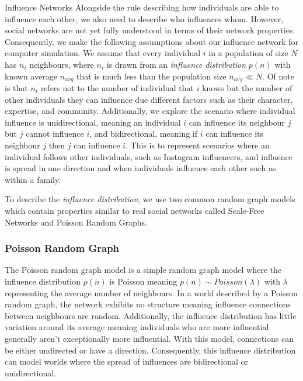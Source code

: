 \documentclass[10pt, oneside, reqno]{amsart}
\makeatletter
\theoremstyle{plain}%
\theoremstyle{definition}
\theoremstyle{remark}
\renewcommand\subsection{\@startsection{subsection}{2}%
  \z@{.5\linespacing\@plus.7\linespacing}{-.5em}%
  {\normalfont\scshape}}
\makeatother
\begin{document}
\subsection{Influence Networks}
Alongside the rule describing how individuals are able to influence each other, we also need to 
describe who influences whom.
However, social networks are not yet fully understood in terms of their network properties. 
Consequently, we make the following assumptions about our influence network for computer 
simulation.
We assume that every individual $i$ in a population of size $N$ has $n_i$ neighbours, where 
$n_i$ is drawn from an \textit{influence distribution} $p(n)$ with known average $n_{avg}$ that is much less 
than the population size $n_{avg} \ll N$.
Of note is that $n_i$ refers not to the number of individual that $i$ knows but the number of 
other individuals they can influence due different factors such as their character, expertise, 
and community.
Additionally, we explore the scenario where individual influence is unidirectional, meaning 
an individual $i$ can influence its neighbour $j$ but $j$ cannot influence $i$, and 
bidirectional, meaning if $i$ can influence its neighbour $j$ then $j$ can influence $i$. 
This is to represent scenarios where an individual follows other individuals, such as Instagram 
influencers, and influence is spread in one direction and when individuals influence each 
other such as within a family.

To describe the \textit{influence distribution}, we use two common random graph models 
which contain properties similar to real social networks called Scale-Free Networks and 
Poisson Random Graphs.


\subsubsection{Poisson Random Graph}
The Poisson random graph model is a simple random graph model where the influence distribution $p(n)$ is Poisson meaning $p(n) \sim Poisson(\lambda)$ with $\lambda$ representing the average number of neighbours. In a world described by a Poisson random graph, the network exhibits no structure meaning influence connections between neighbours are random. 
Additionally, the influence distribution has little variation around its average meaning individuals who are more influential generally aren't exceptionally more influential.
With this model, connections can be either undirected or have a direction.
Consequently, this influence distribution can model worlds where the spread of influences are bidirectional or unidirectional.
\end{document}
